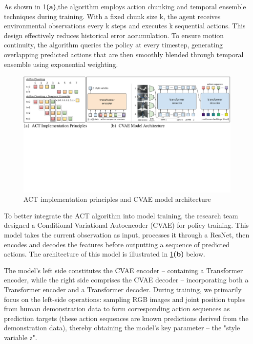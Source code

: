 \documentclass[runningheads]{llncs}
\begin{document}
 As shown in \cref{fig1}\textbf{(a)},the algorithm employs action chunking and temporal ensemble techniques during training. With a fixed chunk size k, the agent receives environmental observations every k steps and executes k sequential actions. This design effectively reduces historical error accumulation. To ensure motion continuity, the algorithm queries the policy at every timestep, generating overlapping predicted actions that are then smoothly blended through temporal ensemble using exponential weighting.

\begin{figure}
\includegraphics[width=\textwidth]{fig1.pdf}
\caption{ ACT implementation principles and  CVAE model architecture} \label{fig1}
\end{figure}


To better integrate the ACT algorithm into model training, the research team designed a Conditional Variational Autoencoder (CVAE) for policy training. This model takes the current observation as input, processes it through a ResNet, then encodes and decodes the features before outputting a sequence of predicted actions. The architecture of this model is illustrated in \cref{fig1}\textbf{(b)} below.



The model's left side constitutes the CVAE encoder – containing a Transformer encoder, while the right side comprises the CVAE decoder – incorporating both a Transformer encoder and a Transformer decoder. During training, we primarily focus on the left-side operations: sampling RGB images and joint position tuples from human demonstration data to form corresponding action sequences as prediction targets (these action sequences are known predictions derived from the demonstration data), thereby obtaining the model's key parameter – the "style variable z".
\end{document}

